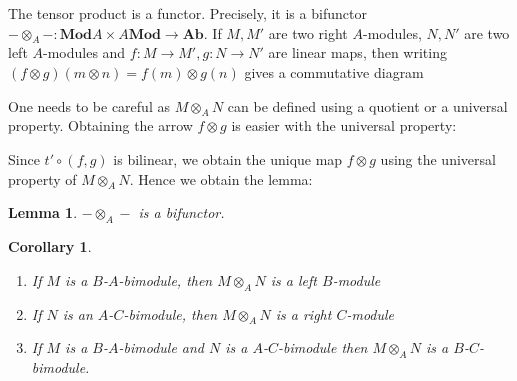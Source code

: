 \documentclass{article}
\newcommand{\id}{\mathrm{id}}
\newcommand{\Mod}{\mathbf{Mod}}
\newcommand{\Ab}{\mathbf{Ab}}
\theoremstyle{plain}
\newtheorem{lemma}[theorem]{Lemma}
\newtheorem{corollary}[theorem]{Corollary}
\theoremstyle{definition}
\theoremstyle{remark}
\begin{document}
\faChevronRight \space The tensor product is a functor. Precisely, it is a bifunctor $- \otimes_A - : \Mod A  \times A \Mod \to \Ab$. If $M,M'$ are two right $A$-modules, $N,N'$ are two left $A$-modules and $f : M \to M', g : N \to N'$ are linear maps, then writing $(f\otimes g)(m\otimes n) = f(m)\otimes g(n)$ gives a commutative diagram
\begin{center}
\end{center}

One needs to be careful as $M\otimes_A N$ can be defined using a quotient or a universal property. Obtaining the arrow $f \otimes g$ is easier with the universal property:

\begin{center}
\end{center}

Since $t' \circ (f,g)$ is bilinear, we obtain the unique map $f \otimes g$ using the universal property of $M \otimes_A N$. Hence we obtain the lemma:

\begin{lemma}
    $- \otimes_A -$ is a bifunctor.
\end{lemma}

\begin{corollary}
    \begin{enumerate}
        \item If $M$ is a $B$-$A$-bimodule, then $M \otimes_A N$ is a left $B$-module
        \item If $N$ is an $A$-$C$-bimodule, then $M \otimes_A N$ is a right $C$-module
        \item If $M$ is a $B$-$A$-bimodule and $N$ is a $A$-$C$-bimodule then $M \otimes_A N$ is a $B$-$C$-bimodule.
    \end{enumerate}
\end{corollary}
\end{document}
